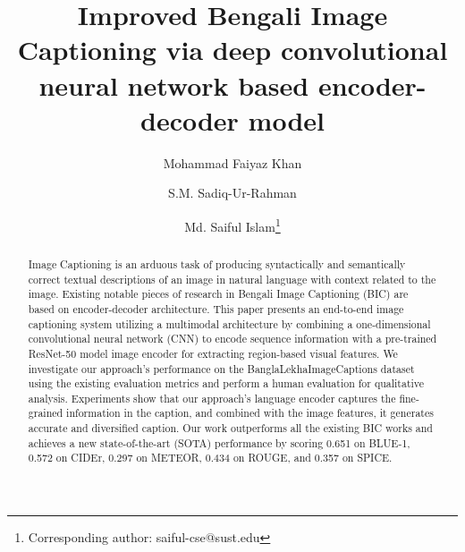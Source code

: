 \documentclass[runningheads]{llncs}
\begin{document}
\title{Improved Bengali Image Captioning via deep convolutional neural network based encoder-decoder model}

\def\correspondingauthor{\footnote{Corresponding author: saiful-cse@sust.edu}}
\author{Mohammad Faiyaz Khan 
\and
 S.M. Sadiq-Ur-Rahman \and
Md. Saiful Islam\correspondingauthor{}}



\maketitle
\begin{abstract}
Image Captioning is an arduous task of producing syntactically and semantically correct textual descriptions of an image in natural language with context related to the image. Existing notable pieces of research in Bengali Image Captioning (BIC) are based on encoder-decoder architecture. This paper presents an end-to-end image captioning system utilizing a multimodal architecture by combining a one-dimensional convolutional neural network (CNN) to encode sequence information with a pre-trained ResNet-50 model image encoder for extracting region-based visual features. We investigate our approach's performance on the BanglaLekhaImageCaptions dataset using the existing evaluation metrics and perform a human evaluation for qualitative analysis. Experiments show that our approach's language encoder captures the fine-grained information in the caption, and combined with the image features, it generates accurate and diversified caption. Our work outperforms all the existing BIC works and achieves a new state-of-the-art (SOTA) performance by scoring 0.651 on BLUE-1, 0.572 on CIDEr, 0.297 on METEOR, 0.434 on ROUGE, and 0.357 on SPICE.  

\end{abstract}
\end{document}
